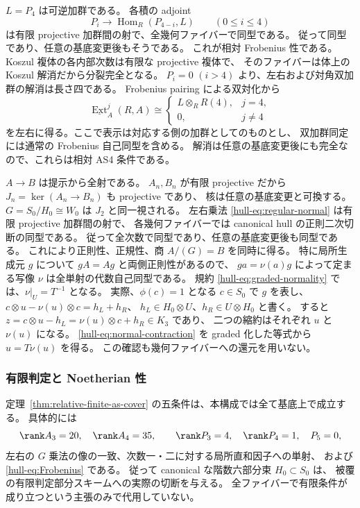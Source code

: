 $L=P_4$ は可逆加群である。
各積の adjoint
\[
 P_i\longrightarrow\operatorname{Hom}_R(P_{4-i},L)
 \qquad(0\le i\le4)
 \tag{UH-18}\label{hull-eq:Frobenius}
\]
は有限 projective 加群間の射で、全幾何ファイバーで同型である。
従って同型であり、任意の基底変更後もそうである。
これが相対 Frobenius 性である。
Koszul 複体の各内部次数は有限な projective 複体で、
そのファイバーは体上の Koszul 解消だから分裂完全となる。
$P_i=0$ $(i>4)$ より、左右および対角双加群の解消は長さ四である。
Frobenius pairing による双対化から
\[
 \underline{\operatorname{Ext}}_A^j(R,A)
 \cong
 \begin{cases}
 L\otimes_RR(4),&j=4,\\
 0,&j\ne4
 \end{cases}
 \tag{UH-19}\label{hull-eq:AS}
\]
を左右に得る。ここで表示は対応する側の加群としてのものとし、
双加群同定には通常の Frobenius 自己同型を含める。
解消は任意の基底変更後にも完全なので、これらは相対 AS4 条件である。

$A\to B$ は提示から全射である。
$A_n,B_n$ が有限 projective だから $J_n=\ker(A_n\to B_n)$ も projective であり、
核は任意の基底変更と可換する。
$G=S_0/H_0\cong W_0$ は $J_2$ と同一視される。
左右乗法 \eqref{hull-eq:regular-normal} は有限 projective 加群間の射で、
各幾何ファイバーでは canonical hull の正則二次切断の同型である。
従って全次数で同型であり、任意の基底変更後も同型である。
これにより正則性、正規性、商 $A/(G)=B$ を同時に得る。
特に局所生成元 $g$ について $gA=Ag$ と両側正則性があるので、
$ga=\nu(a)g$ によって定まる写像 $\nu$ は全単射の代数自己同型である。
規約 \eqref{hull-eq:graded-normality} では、$\nu|_U=T^{-1}$ となる。
実際、$\phi(c)=1$ となる $c\in S_0$ で $g$ を表し、
$c\otimes u-\nu(u)\otimes c=h_L+h_R$、
$h_L\in H_0\otimes U$、$h_R\in U\otimes H_0$ と書く。
すると $z=c\otimes u-h_L=\nu(u)\otimes c+h_R\in K_3$ であり、
二つの縮約はそれぞれ $u$ と $\nu(u)$ になる。
\eqref{hull-eq:normal-contraction} を graded 化した等式から $u=T\nu(u)$ を得る。
この確認も幾何ファイバーへの還元を用いない。

\subsubsection{有限判定と Noetherian 性}

定理~\ref{thm:relative-finite-as-cover} の五条件は、本構成では全て基底上で成立する。
具体的には
\[
 \rank A_3=20,\quad\rank A_4=35,\qquad
 \rank P_3=4,\quad\rank P_4=1,\quad P_5=0,
\]
左右の $G$ 乗法の像の一致、次数一・二に対する局所直和因子への単射、
および \eqref{hull-eq:Frobenius} である。
従って canonical な階数六部分束 $H_0\subset S_0$ は、
被覆の有限判定部分スキームへの実際の切断を与える。
全ファイバーで有限条件が成り立つという主張のみで代用していない。

